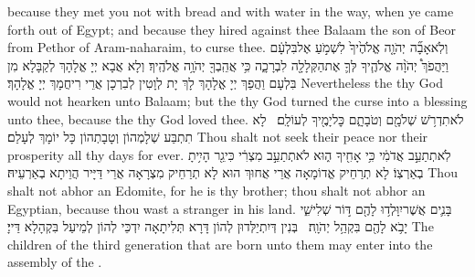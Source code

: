{because they met you not with bread and with water in the way, when ye came forth out of Egypt; and because they hired against thee Balaam the son of Beor from Pethor of Aram-naharaim, to curse thee.}{}
{וְלֹֽא\maqqaf אָבָ֞ה יְהֹוָ֤ה אֱלֹהֶ֙יךָ֙ לִשְׁמֹ֣עַ אֶל\maqqaf בִּלְעָ֔ם וַיַּהֲפֹךְ֩ יְהֹוָ֨ה אֱלֹהֶ֧יךָ לְּךָ֛ אֶת\maqqaf הַקְּלָלָ֖ה לִבְרָכָ֑ה כִּ֥י אֲהֵֽבְךָ֖ יְהֹוָ֥ה אֱלֹהֶֽיךָ׃}
{וְלָא אֲבָא יְיָ אֱלָהָךְ לְקַבָּלָא מִן בִּלְעָם וַהֲפַךְ יְיָ אֱלָהָךְ לָךְ יָת לְוָטִין לְבִרְכָן אֲרֵי רִיחֲמָךְ יְיָ אֱלָהָךְ׃}
{Nevertheless the \lord\space thy God would not hearken unto Balaam; but the \lord\space thy God turned the curse into a blessing unto thee, because the \lord\space thy God loved thee.}{}
{לֹא\maqqaf תִדְרֹ֥שׁ שְׁלֹמָ֖ם וְטֹבָתָ֑ם כׇּל\maqqaf יָמֶ֖יךָ לְעוֹלָֽם׃ \setuma }
{לָא תִתְבַּע שְׁלָמְהוֹן וְטָבָתְהוֹן כָּל יוֹמָךְ לְעָלַם׃}
{Thou shalt not seek their peace nor their prosperity all thy days for ever.}{}
{לֹֽא\maqqaf תְתַעֵ֣ב אֲדֹמִ֔י כִּ֥י אָחִ֖יךָ ה֑וּא לֹא\maqqaf תְתַעֵ֣ב מִצְרִ֔י כִּי\maqqaf גֵ֖ר הָיִ֥יתָ בְאַרְצֽוֹ׃}
{לָא תְרַחֵיק אֱדוֹמָאָה אֲרֵי אֲחוּךְ הוּא לָא תְרַחֵיק מִצְרָאָה אֲרֵי דַּיָּיר הֲוֵיתָא בְאַרְעֵיהּ׃}
{Thou shalt not abhor an Edomite, for he is thy brother; thou shalt not abhor an Egyptian, because thou wast a stranger in his land.}{}
{בָּנִ֛ים אֲשֶׁר\maqqaf יִוָּלְד֥וּ לָהֶ֖ם דּ֣וֹר שְׁלִישִׁ֑י יָבֹ֥א לָהֶ֖ם בִּקְהַ֥ל יְהֹוָֽה׃ \setuma }
{בְּנִין דְּיִתְיַלְּדוּן לְהוֹן דָּרָא תְּלִיתָאָה יִדְכֵּי לְהוֹן לְמֵיעַל בִּקְהָלָא דַּייָ׃}
{The children of the third generation that are born unto them may enter into the assembly of the \lord.}{}
